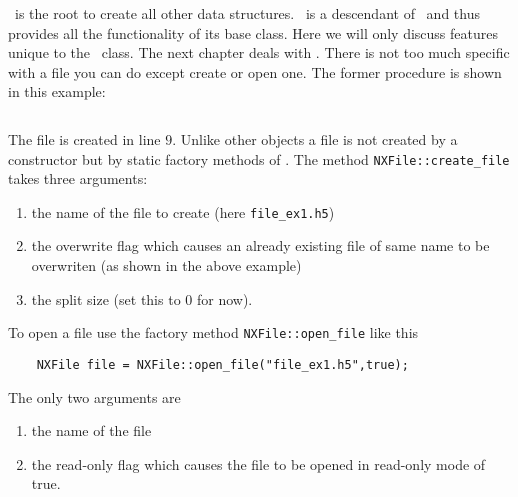 \nxfile\ is the root to create all other data structures. 
\nxfile\ is a descendant of \nxgroup\ and thus provides all the functionality of
its base class. Here we will only discuss features unique to the \nxfile\ class.
The next chapter deals with \nxgroup.
There is not too much specific with a file you can do except create or open one.
The former procedure is shown in this example:
\inputminted[linenos=true]{c++}{../examples/c++/nxfile_ex1.cpp}

The file is created in line $9$. Unlike other objects a file is not 
created by a constructor but by static factory methods of \nxfile.
The method {\tt NXFile::create\_file} takes three arguments: 
\begin{enumerate}
    \item the name of the file to create (here {\tt file\_ex1.h5})
    \item the overwrite flag which causes an already existing file of same name
    to be overwriten (as shown in the above example)
    \item the split size (set this to $0$ for now).
\end{enumerate}
To open a file use the factory method {\tt NXFile::open\_file} like this
\begin{verbatim}
    NXFile file = NXFile::open_file("file_ex1.h5",true);
\end{verbatim}
The only two arguments are
\begin{enumerate}
    \item the name of the file
    \item the read-only flag which causes the file to be opened in read-only
    mode of true.
\end{enumerate}


